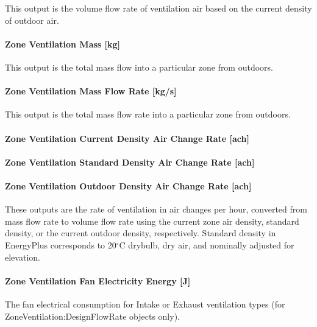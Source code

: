 This output is the volume flow rate of ventilation air based on the current density of outdoor air.

\paragraph{Zone Ventilation Mass {[}kg{]}}\label{zone-ventilation-mass-kg}

This output is the total mass flow into a particular zone from outdoors.

\paragraph{Zone Ventilation Mass Flow Rate {[}kg/s{]}}\label{zone-ventilation-mass-flow-rate-kgs}

This output is the total mass flow rate into a particular zone from outdoors.

\paragraph{Zone Ventilation Current Density Air Change Rate {[}ach{]}}\label{zone-ventilation-air-change-rate-ach}
\paragraph{Zone Ventilation Standard Density Air Change Rate {[}ach{]}}\label{zone-ventilation-standard-air-change-rate-ach}
\paragraph{Zone Ventilation Outdoor Density Air Change Rate {[}ach{]}}\label{zone-ventilation-outdoor-air-change-rate-ach}

These outputs are the rate of ventilation in air changes per hour, converted from mass flow rate to volume flow rate using the current zone air density, standard density, or the current outdoor density, respectively. Standard density in EnergyPlus corresponds to 20$^\circ$C drybulb, dry air, and nominally adjusted for elevation.

\paragraph{Zone Ventilation Fan Electricity Energy {[}J{]}}\label{zone-ventilation-fan-electric-energy-j}

The fan electrical consumption for Intake or Exhaust ventilation types (for ZoneVentilation:DesignFlowRate objects only).

